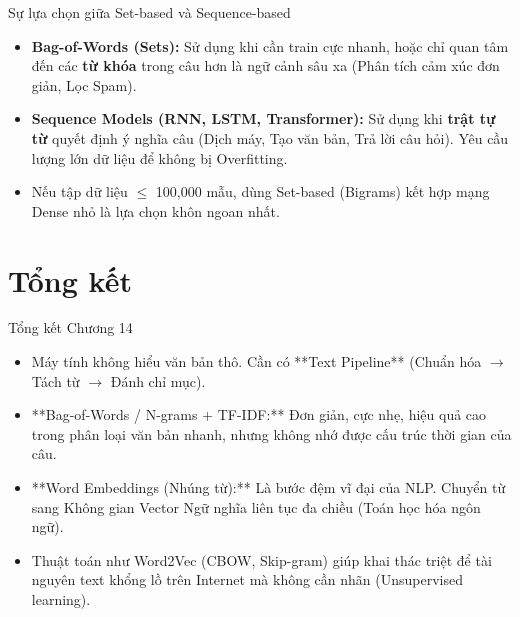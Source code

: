 \documentclass[aspectratio=169]{beamer}
\begin{document}
\begin{frame}{Sự lựa chọn giữa Set-based và Sequence-based}
    \begin{itemize}
        \item \textbf{Bag-of-Words (Sets):} Sử dụng khi cần train cực nhanh, hoặc chỉ quan tâm đến các \textbf{từ khóa} trong câu hơn là ngữ cảnh sâu xa (Phân tích cảm xúc đơn giản, Lọc Spam).
        \item \textbf{Sequence Models (RNN, LSTM, Transformer):} Sử dụng khi \textbf{trật tự từ} quyết định ý nghĩa câu (Dịch máy, Tạo văn bản, Trả lời câu hỏi). Yêu cầu lượng lớn dữ liệu để không bị Overfitting.
        \item Nếu tập dữ liệu $\leq$ 100,000 mẫu, dùng Set-based (Bigrams) kết hợp mạng Dense nhỏ là lựa chọn khôn ngoan nhất.
    \end{itemize}
\end{frame}


\section{Tổng kết}

\begin{frame}{Tổng kết Chương 14}
    \begin{itemize}
        \item Máy tính không hiểu văn bản thô. Cần có **Text Pipeline** (Chuẩn hóa $\rightarrow$ Tách từ $\rightarrow$ Đánh chỉ mục).
        \item **Bag-of-Words / N-grams + TF-IDF:** Đơn giản, cực nhẹ, hiệu quả cao trong phân loại văn bản nhanh, nhưng không nhớ được cấu trúc thời gian của câu.
        \item **Word Embeddings (Nhúng từ):** Là bước đệm vĩ đại của NLP. Chuyển từ sang Không gian Vector Ngữ nghĩa liên tục đa chiều (Toán học hóa ngôn ngữ).
        \item Thuật toán như Word2Vec (CBOW, Skip-gram) giúp khai thác triệt để tài nguyên text khổng lồ trên Internet mà không cần nhãn (Unsupervised learning).
    \end{itemize}
\end{frame}
\end{document}
